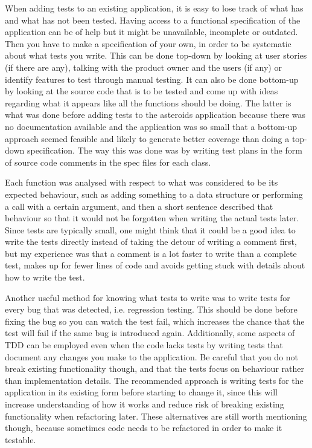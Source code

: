 \documentclass[11pt]{article}
\begin{document}
When adding tests to an existing application, it is easy to lose track of what has and what has not been tested. Having access to a functional specification of the application can be of help but it might be unavailable, incomplete or outdated. Then you have to make a specification of your own, in order to be systematic about what tests you write. This can be done top-down by looking at user stories (if there are any), talking with the product owner and the users (if any) or identify features to test through manual testing. It can also be done bottom-up by looking at the source code that is to be tested and come up with ideas regarding what it appears like all the functions should be doing. The latter is what was done before adding tests to the asteroids application because there was no documentation available and the application was so small that a bottom-up approach seemed feasible and likely to generate better coverage than doing a top-down specification. The way this was done was by writing test plans in the form of source code comments in the spec files for each class.

Each function was analysed with respect to what was considered to be its expected behaviour, such as adding something to a data structure or performing a call with a certain argument, and then a short sentence described that behaviour so that it would not be forgotten when writing the actual tests later. Since tests are typically small, one might think that it could be a good idea to write the tests directly instead of taking the detour of writing a comment first, but my experience was that a comment is a lot faster to write than a complete test, makes up for fewer lines of code and avoids getting stuck with details about how to write the test.

Another useful method for knowing what tests to write was to write tests for every bug that was detected, i.e. regression testing. This should be done before fixing the bug so you can watch the test fail, which increases the chance that the test will fail if the same bug is introduced again. Additionally, some aspects of TDD can be employed even when the code lacks tests by writing tests that document any changes you make to the application. Be careful that you do not break existing functionality though, and that the tests focus on behaviour rather than implementation details. The recommended approach is writing tests for the application in its existing form before starting to change it, since this will increase understanding of how it works and reduce risk of breaking existing functionality when refactoring later. These alternatives are still worth mentioning though, because sometimes code needs to be refactored in order to make it testable.
\end{document}
